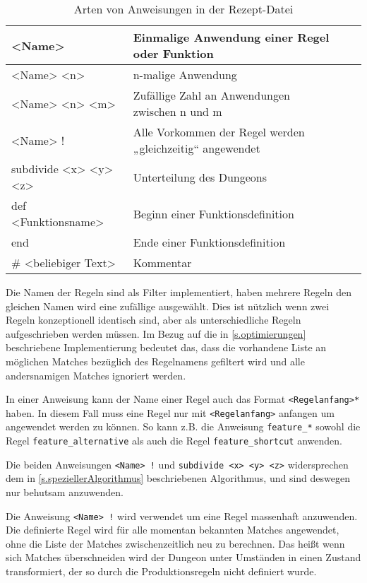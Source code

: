 \begin{table}[h]
    \begin{tabular}{@{}llll@{}}
        \toprule
        <Name> & Einmalige Anwendung einer Regel oder Funktion \\ \midrule
        <Name> <n> & n-malige Anwendung \\ \midrule
        <Name> <n> <m> & Zufällige Zahl an Anwendungen zwischen n und m \\ \midrule
        <Name> ! & Alle Vorkommen der Regel werden „gleichzeitig“ angewendet \\ \midrule
        subdivide <x> <y> <z> & Unterteilung des Dungeons \\ \midrule
        def <Funktionsname> & Beginn einer Funktionsdefinition \\ \midrule
        end & Ende einer Funktionsdefinition \\ \midrule
        \# <beliebiger Text> & Kommentar \\ \bottomrule
    \end{tabular}
    \caption{Arten von Anweisungen in der Rezept-Datei}
    \label{t.anweisungen}
\end{table}

Die Namen der Regeln sind als Filter implementiert, haben mehrere Regeln den gleichen Namen wird eine zufällige ausgewählt. Dies ist nützlich wenn zwei Regeln konzeptionell identisch sind, aber als unterschiedliche Regeln aufgeschrieben werden müssen. Im Bezug auf die in \ref{s.optimierungen} beschriebene Implementierung bedeutet das, dass die vorhandene Liste an möglichen Matches bezüglich des Regelnamens gefiltert wird und alle andersnamigen Matches ignoriert werden. 

In einer Anweisung kann der Name einer Regel auch das Format \texttt{<Regelanfang>*} haben. In diesem Fall muss eine Regel nur mit \texttt{<Regelanfang>} anfangen um angewendet werden zu können. So kann z.B. die Anweisung \texttt{feature\_*} sowohl die Regel \texttt{feature\_alternative} als auch die Regel \texttt{feature\_shortcut} anwenden.

Die beiden Anweisungen \texttt{<Name> !} und \texttt{subdivide <x> <y> <z>} widersprechen dem in \ref{s.speziellerAlgorithmus} beschriebenen Algorithmus, und sind deswegen nur behutsam anzuwenden.

Die Anweisung \texttt{<Name> !} wird verwendet um eine Regel massenhaft anzuwenden. Die definierte Regel wird für alle momentan bekannten Matches angewendet, ohne die Liste der Matches zwischenzeitlich neu zu berechnen. Das heißt wenn sich Matches überschneiden wird der Dungeon unter Umständen in einen Zustand transformiert, der so durch die Produktionsregeln nicht definiert wurde. 


